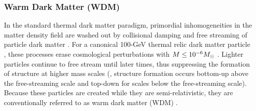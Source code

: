 
\subsubsection{Warm Dark Matter (WDM)}
\label{sec:wdm}


In the standard thermal dark matter paradigm, primordial inhomogeneities in the matter density field are washed out by collisional damping and free streaming of particle dark matter \citep{Hofmann:2001,Green:2003un, Bertschinger:2006nq, Loeb:2005pm}.  
For a canonical 100-GeV thermal relic dark matter particle \citep[\eg, the WIMP;][]{Jungman:1995df}, these processes erase cosmological perturbations with $M \leq 10^{-6} M_\odot$ \citep[i.e., Earth mass;][]{Green:2003un}. 
Lighter particles continue to free stream until later times, thus suppressing the formation of structure at higher mass scales (\eg, structure formation occurs bottom-up above the free-streaming scale and top-down for scales below the free-streaming scale). Because these particles are created while they are semi-relativistic, they are conventionally referred to as warm dark matter (WDM) \citep{Bond:1983hb,Bode:2000gq,Dalcanton:2000hn}. 


